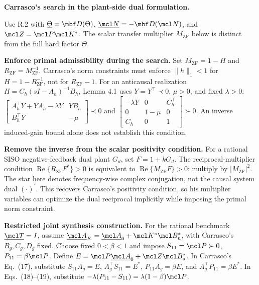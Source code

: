﻿%
\textbf{Carrasco's search in the plant-side dual formulation.}

Use R.2 with \(\underline\Theta=\mbf D(\Theta)\),
\(\underline{\mcl N}=-\mbf D(\mcl N)\), and
\(\mcl Z=\mcl P\mcl K^*\).
The scalar transfer multiplier \(M_{\mathrm{ZF}}\) below is distinct
from the full hard factor \(\Theta\).

\textbf{Enforce primal admissibility during the search.}
Set \(M_{\mathrm{ZF}}=1-H\) and
\(R_{\mathrm{ZF}}=M_{\mathrm{ZF}}^{-1}\).
Carrasco's norm constraints must enforce \(\|h\|_1<1\) for
\(H=1-R_{\mathrm{ZF}}^{-1}\), not for \(R_{\mathrm{ZF}}-1\).
For an anticausal realization
\(H=C_h(sI-A_h)^{-1}B_h\), Lemma 4.1 uses
\(Y=Y^\top\prec0\), \(\mu>0\), and fixed \(\lambda>0\):
\(\begin{bmatrix}A_h^\top Y+YA_h-\lambda Y&YB_h\\
B_h^\top Y&-\mu\end{bmatrix}\prec0\) and
\(\begin{bmatrix}-\lambda Y&0&C_h^\top\\
0&1-\mu&0\\C_h&0&1\end{bmatrix}\succ0\).
An inverse induced-gain bound alone does not establish this condition.

\textbf{Remove the inverse from the scalar positivity condition.}
For a rational SISO negative-feedback dual plant \(G_d\), set
\(F=1+kG_d\).
The reciprocal-multiplier condition
\(\operatorname{Re}\{R_{\mathrm{ZF}}F^*\}>0\)
is equivalent to \(\operatorname{Re}\{M_{\mathrm{ZF}}F\}>0\):
multiply by \(|M_{\mathrm{ZF}}|^2\).
The star here denotes frequency-wise complex conjugation, not
the causal system dual \((\cdot)^\prime\).
This recovers Carrasco's positivity condition, so his multiplier
variables can optimize the dual reciprocal implicitly while imposing
the primal norm constraint.

\textbf{Restricted joint synthesis construction.}
For the rational benchmark \(\underline{\mcl T}=I\), assume
\(\underline{\mcl A}_K=\underline{\mcl A}_0+
\mcl K^*\mcl B_{\mathrm u}^*\), with Carrasco's \(B_g,C_g,D_g\) fixed.
Choose fixed \(0<\beta<1\) and impose
\(S_{11}=\mcl P\succ0\), \(P_{11}=\beta\mcl P\).
Define \(E=\mcl P\underline{\mcl A}_0+\mcl Z\mcl B_{\mathrm u}^*\).
In Carrasco's Eq.~(17), substitute
\(S_{11}A_g=E\), \(A_g^\top S_{11}=E^*\),
\(P_{11}A_g=\beta E\), and \(A_g^\top P_{11}=\beta E^*\).
In Eqs.~(18)--(19), substitute
\(-\lambda(P_{11}-S_{11})=\lambda(1-\beta)\mcl P\).


